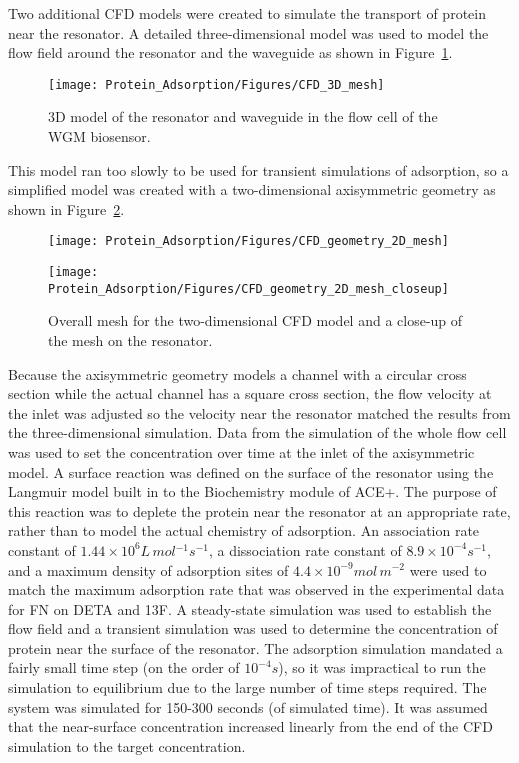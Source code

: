 Two additional CFD models were created to simulate the transport of
protein near the resonator. A detailed three-dimensional model was
used to model the flow field around the resonator and the waveguide
as shown in Figure~\ref{fig:CFD 3D resonator}.%
\begin{figure}
\texttt{[image: Protein\_Adsorption/Figures/CFD\_3D\_mesh]}

\caption{\label{fig:CFD 3D resonator}3D model of the resonator and waveguide
in the flow cell of the WGM biosensor.}


%
\end{figure}
 This model ran too slowly to be used for transient simulations of
adsorption, so a simplified model was created with a two-dimensional
axisymmetric geometry as shown in Figure~\ref{fig:CFD Mesh 2D}.%
\begin{figure}
\texttt{[image: Protein\_Adsorption/Figures/CFD\_geometry\_2D\_mesh]}

\texttt{[image: Protein\_Adsorption/Figures/CFD\_geometry\_2D\_mesh\_closeup]}

\caption{\label{fig:CFD Mesh 2D}Overall mesh for the two-dimensional CFD model
and a close-up of the mesh on the resonator.}


%
\end{figure}
 Because the axisymmetric geometry models a channel with a circular
cross section while the actual channel has a square cross section,
the flow velocity at the inlet was adjusted so the velocity near the
resonator matched the results from the three-dimensional simulation.
Data from the simulation of the whole flow cell was used to set the
concentration over time at the inlet of the axisymmetric model. A
surface reaction was defined on the surface of the resonator using
the Langmuir model built in to the Biochemistry module of ACE+. The
purpose of this reaction was to deplete the protein near the resonator
at an appropriate rate, rather than to model the actual chemistry
of adsorption. An association rate constant of $1.44\times10^{6}L\, mol{}^{-1}s^{-1}$,
a dissociation rate constant of $8.9\times10^{-4}s^{-1}$, and a maximum
density of adsorption sites of $4.4\times10^{-9}mol\, m^{-2}$ were
used to match the maximum adsorption rate that was observed in the
experimental data for FN on DETA and 13F. A steady-state simulation
was used to establish the flow field and a transient simulation was
used to determine the concentration of protein near the surface of
the resonator. The adsorption simulation mandated a fairly small time
step (on the order of $10^{-4}s$), so it was impractical to run the
simulation to equilibrium due to the large number of time steps required.
The system was simulated for 150-300 seconds (of simulated time).
It was assumed that the near-surface concentration increased linearly
from the end of the CFD simulation to the target concentration.


